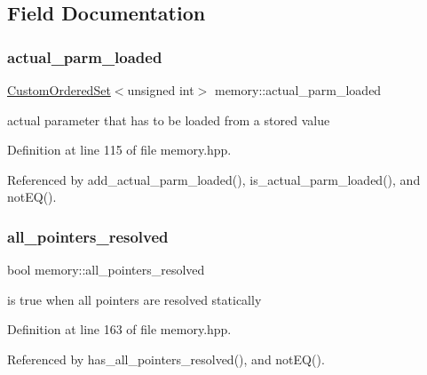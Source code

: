 \subsection{Field Documentation}
\mbox{\label{classmemory_ade20269d0dbb7efbf708fd694bb82d82}} 
\subsubsection{\texorpdfstring{actual\+\_\+parm\+\_\+loaded}{actual\_parm\_loaded}}
{\footnotesize\ttfamily \hyperlink{classCustomOrderedSet}{Custom\+Ordered\+Set}$<$unsigned int$>$ memory\+::actual\+\_\+parm\+\_\+loaded\hspace{0.3cm}{\ttfamily [private]}}



actual parameter that has to be loaded from a stored value 



Definition at line 115 of file memory.\+hpp.



Referenced by add\+\_\+actual\+\_\+parm\+\_\+loaded(), is\+\_\+actual\+\_\+parm\+\_\+loaded(), and not\+E\+Q().

\mbox{\label{classmemory_a5baad078a5d727ffd398b13f38bea29d}} 
\subsubsection{\texorpdfstring{all\+\_\+pointers\+\_\+resolved}{all\_pointers\_resolved}}
{\footnotesize\ttfamily bool memory\+::all\+\_\+pointers\+\_\+resolved\hspace{0.3cm}{\ttfamily [private]}}



is true when all pointers are resolved statically 



Definition at line 163 of file memory.\+hpp.



Referenced by has\+\_\+all\+\_\+pointers\+\_\+resolved(), and not\+E\+Q().


